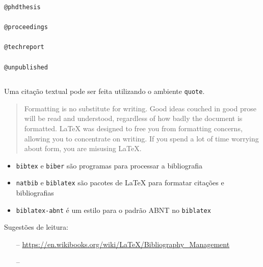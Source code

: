 \begin{frame}
\begin{columns}[c]
\begin{verbatim}
@phdthesis 

@proceedings 

@techreport 

@unpublished 
\end{verbatim}
\end{columns}

\framebreak

Uma citação textual pode ser feita utilizando o ambiente \verb|quote|.

\begin{LTXexample}
\begin{quote}
Formatting is no substitute for writing. Good ideas couched in
good prose will be read and understood, regardless of how badly the document
is formatted. \LaTeX{} was designed to free you from formatting concerns, allowing
you to concentrate on writing. If you spend a lot of time worrying about form,
you are misusing \LaTeX{}.
\end{quote}
\end{LTXexample}
\cite{lamport_latex_1994}

\framebreak

\begin{itemize}
\item \texttt{bibtex} e \texttt{biber} são programas para processar a bibliografia
\item \texttt{natbib} e \texttt{biblatex} são pacotes de \LaTeX{} para formatar citações e bibliografias
\item \texttt{biblatex-abnt} é um estilo para o padrão ABNT no \texttt{biblatex} 
\end{itemize}

\vspace{2ex}
Sugestões de leitura:
\begin{itemize}
\item[--] \url{https://en.wikibooks.org/wiki/LaTeX/Bibliography_Management}
\item[--] 
\end{itemize}
\end{frame}

